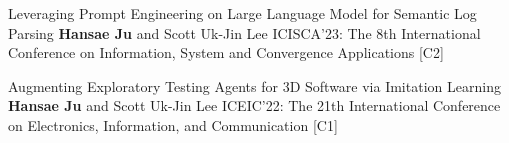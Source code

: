 \begin{cventries}
  \pbentry
  {Leveraging Prompt Engineering on Large Language Model for Semantic Log Parsing} %
  {\textbf{Hansae Ju} and Scott Uk-Jin Lee}
  {ICISCA'23: The 8th International Conference on Information, System and Convergence Applications}
  {\href{https://github.com/Verssae/Verssae/blob/3f89da13976aaa5cbd1e3bdce61926b392d6e797/assets/papers/ICISCA\%2023/Leveraging\%20Prompt\%20Engineering\%20on\%20Large\%20Language\%20Model\%20for\%20Semantic\%20Log\%20Parsing.pdf}{\paper}}
  {\href{https://github.com/Verssae/LogParsingGPT}{\githubCode}}
  {[C2]}

  \pbentry
  {Augmenting Exploratory Testing Agents for 3D Software via Imitation Learning } %
  {\textbf{Hansae Ju} and Scott Uk-Jin Lee}
  {ICEIC'22: The 21th International Conference on Electronics, Information, and Communication}
  {\href{https://github.com/Verssae/Verssae/blob/3f89da13976aaa5cbd1e3bdce61926b392d6e797/assets/papers/ICEIC\%2022/Augmenting\%20Exploratory\%20Testing\%20Agents\%20for\%203D\%20Software\%20via\%20Imitation\%20Learning.pdf}{\paper}}
  {\href{https://github.com/Verssae/testing-ml-agents}{\githubCode}}
  {[C1]}

\end{cventries}

